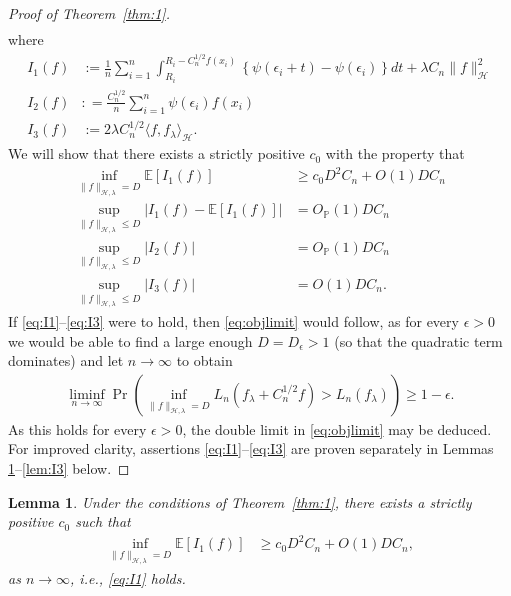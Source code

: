 \documentclass[11pt]{article}
\newtheorem{lemma}{Lemma}
\theoremstyle{definition}
\theoremstyle{remark}
\begin{document}
\begin{proof}[Proof of Theorem~\ref{thm:1}]
\begin{align*}
\end{align*}
where
\begin{align*}
I_1(f) &:= \frac{1}{n} \sum_{i=1}^n \int_{R_i}^{R_i-C_n^{1/2}f(x_i)} \left\{ \psi\left(\epsilon_i+t \right) - \psi \left( \epsilon_i \right) \right\} d t  + \lambda C_n \|f\|_{\mathcal{H}}^2 \\
I_2(f) &: = \frac{C_n^{1/2}}{n} \sum_{i=1}^n \psi(\epsilon_i) f(x_i) \\
I_3(f) &:= 2 \lambda C_n^{1/2} \langle f, f_\lambda \rangle_{\mathcal{H}}. 
\end{align*}
We will show that there exists a strictly positive $c_0$ with the property that
\begin{align}
\inf_{\|f\|_{\mathcal{H},\lambda}=D} \mathbb{E}[I_1(f)] & \geq c_0 D^2 C_n+ O(1)  DC_n  \label{eq:I1} \\
\sup_{\|f\|_{\mathcal{H},\lambda} \leq D} |I_1(f) - \mathbb{E}[I_1(f)]| & = O_{\mathbb{P}}(1) D C_n  \label{eq:I1md}\\
\sup_{\|f\|_{\mathcal{H},\lambda} \leq D} |I_2(f)| & = O_{\mathbb{P}}(1)D C_n  \label{eq:I2}
\\ \sup_{\|f\|_{\mathcal{H},\lambda} \leq D} |I_3(f)| & = O(1) D C_n \label{eq:I3}. 
\end{align}
If \eqref{eq:I1}--\eqref{eq:I3} were to hold, then \eqref{eq:objlimit} would follow, as for every $\epsilon>0$ we would be able to find a large enough $D = D_{\epsilon} > 1$ (so that the quadratic term dominates) and let $n \to \infty$ to obtain
\begin{align*}
\liminf_{n \to \infty} \Pr\left(\inf_{\|f\|_{\mathcal{H},\lambda}=D} L_n(f_{\lambda}+C_n^{1/2}f)> L_n(f_\lambda) \right) \geq 1-\epsilon.
\end{align*}
As this holds for every $\epsilon>0$, the double limit in \eqref{eq:objlimit} may  be deduced. For improved clarity, assertions  \eqref{eq:I1}--\eqref{eq:I3} are proven separately in Lemmas \ref{lem:I1}--\ref{lem:I3} below.
\end{proof}

\begin{lemma}
\label{lem:I1}
Under the conditions of Theorem~\ref{thm:1}, there exists a strictly positive $c_0$ such that
\begin{align*}
\inf_{\|f\|_{\mathcal{H},\lambda}=D}\mathbb{E}[I_1(f)] & \geq c_0 D^2 C_n+ O(1) D C_n,
\end{align*}
as $n \to \infty$, i.e., \eqref{eq:I1} holds.
\end{lemma}
\end{document}
